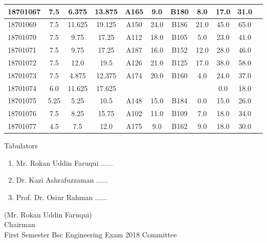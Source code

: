 \documentclass[12pt]{article}
\begin{document}
\begin{center}
\begin{small}
\begin{tabular}{|l|c|c|c|c|c|c|c|c|c|c|}
18701067 & 7.5 & 6.375 & 13.875 & A165 & 9.0 & B180 & 8.0 & 17.0 & 31.0\\ \hline 
18701069 & 7.5 & 11.625 & 19.125 & A150 & 24.0 & B186 & 21.0 & 45.0 & 65.0\\ \hline 
18701070 & 7.5 & 9.75 & 17.25 & A112 & 18.0 & B105 & 5.0 & 23.0 & 41.0\\ \hline 
18701071 & 7.5 & 9.75 & 17.25 & A187 & 16.0 & B152 & 12.0 & 28.0 & 46.0\\ \hline 
18701072 & 7.5 & 12.0 & 19.5 & A126 & 21.0 & B125 & 17.0 & 38.0 & 58.0\\ \hline 
18701073 & 7.5 & 4.875 & 12.375 & A174 & 20.0 & B160 & 4.0 & 24.0 & 37.0\\ \hline 
18701074 & 6.0 & 11.625 & 17.625 &  &  &  &  & 0.0 & 18.0\\ \hline 
18701075 & 5.25 & 5.25 & 10.5 & A148 & 15.0 & B184 & 0.0 & 15.0 & 26.0\\ \hline 
18701076 & 7.5 & 8.25 & 15.75 & A102 & 11.0 & B109 & 7.0 & 18.0 & 34.0\\ \hline 
18701077 & 4.5 & 7.5 & 12.0 & A175 & 9.0 & B162 & 9.0 & 18.0 & 30.0\\ \hline 
        \end{tabular}
            \end{small}
            \end{center}
  \centering
            
            \begin{table}[hb]
            	\centering
            \begin{minipage}[b]{0.5\linewidth} %
            {\centering Tabulators }
            \begin{enumerate}
                \item Mr. Rokan Uddin Faruqui \hspace*{1ex} $\ldots \ldots  $  
                \item Dr. Kazi Ashrafuzzaman \hspace*{1ex} $\ldots \ldots  $  
                \item Prof. Dr. Osiur Rahman \hspace*{1ex} $\ldots \ldots $  
            \end{enumerate} 

            \end{minipage}
            \hspace*{1.2cm}
            \begin{minipage}[b]{0.4\linewidth} \centering
            (Mr. Rokan Uddin Faruqui) \\
            Chairman  \hspace*{1ex} \\
           First Semester Bsc Engineering Exam 2018 Committee
            \end{minipage}
            \end{table}
            \clearpage
            \clearpage
            
\end{document}
